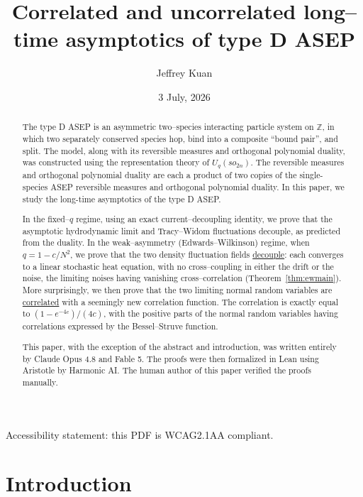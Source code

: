 \documentclass[11pt]{article}
\title{\bf Correlated and uncorrelated long--time asymptotics of type D ASEP}
\author{Jeffrey Kuan}
\date{3 July, 2026}
\theoremstyle{plain}
\theoremstyle{definition}
\theoremstyle{remark}
\newcommand{\Z}{\mathbb{Z}}\newcommand{\R}{\mathbb{R}}\newcommand{\N}{\mathbb{N}}
\begin{document}
Accessibility statement: this PDF is WCAG2.1AA compliant.

\maketitle

\begin{abstract}
The type D ASEP is an asymmetric  two--species interacting particle system on $\Z$, in which two separately conserved species hop, bind into a composite ``bound pair'', and split. The model, along with its reversible measures and orthogonal polynomial duality, was constructed using the representation theory of $U_q(so_{2n})$. The reversible measures and orthogonal polynomial duality are each a product of two copies of the single-species ASEP reversible measures and orthogonal polynomial duality. In this paper, we study the long-time asymptotics of the type D ASEP. 

In the fixed--$q$ regime, using an exact current--decoupling identity, we prove that the asymptotic hydrodynamic limit and Tracy--Widom fluctuations decouple, as predicted from the duality. In the weak--asymmetry (Edwards--Wilkinson) regime, when $q=1-c/N^2$, we prove
that the two density fluctuation fields \underline{decouple}: each converges to a linear
stochastic heat equation, with no cross--coupling in either the drift or the noise,
the limiting noises having vanishing cross--correlation (Theorem~\ref{thm:ewmain}).
More surprisingly, we then prove that the two limiting normal random variables are \underline{correlated} with a seemingly new correlation function. The correlation is exactly equal to $(1-e^{-4c})/(4c)$, with the positive parts of the normal random variables having correlations expressed by the Bessel--Struve function. 

This paper, with the exception of the abstract and introduction, was written entirely by Claude Opus 4.8 and Fable 5. The proofs were then formalized in Lean using Aristotle by Harmonic AI. The human author of this paper verified the proofs manually.

\end{abstract}



{\small\tableofcontents}

\section{Introduction}\label{sec:intro}
\end{document}
